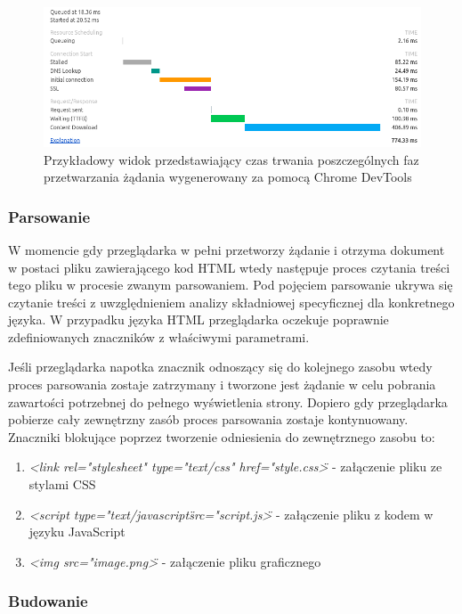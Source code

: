 \documentclass[polish, twoside, 12pt]{mwart}
\begin{document}
\begin{figure}[ht]
  \includegraphics[width=\textwidth]{request-timing-chrome.png}
	\caption{Przykładowy widok przedstawiający czas trwania poszczególnych faz przetwarzania żądania wygenerowany za pomocą Chrome DevTools}
\end{figure}

\subsubsection{Parsowanie}

W momencie gdy przeglądarka w pełni przetworzy żądanie i otrzyma dokument w postaci pliku zawierającego kod HTML wtedy następuje proces czytania treści tego pliku w procesie zwanym parsowaniem. Pod pojęciem parsowanie ukrywa się czytanie treści z uwzględnieniem analizy składniowej specyficznej dla konkretnego języka. W przypadku języka HTML przeglądarka oczekuje poprawnie zdefiniowanych znaczników z właściwymi parametrami. 

Jeśli przeglądarka napotka znacznik odnoszący się do kolejnego zasobu wtedy proces parsowania zostaje zatrzymany i tworzone jest żądanie  w celu pobrania zawartości potrzebnej do pełnego wyświetlenia strony. Dopiero gdy przeglądarka pobierze cały zewnętrzny zasób proces parsowania zostaje kontynuowany. Znaczniki blokujące poprzez tworzenie odniesienia do zewnętrznego zasobu to:

\begin{enumerate}
  \item \emph{<link rel="stylesheet" type="text/css" href="style.css\">} - załączenie pliku ze stylami CSS
  \item \emph{<script type="text/javascript\" src="script.js\">} - załączenie pliku z kodem w języku JavaScript
  \item \emph{<img src="image.png\">} - załączenie pliku graficznego
\end{enumerate}

\subsubsection{Budowanie}
\end{document}
